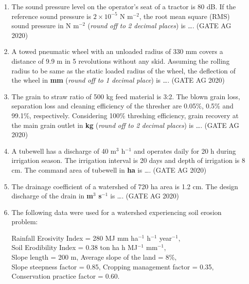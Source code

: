 \documentclass[journal]{IEEEtran}
\begin{document}
\begin{enumerate}
\medskip

\item 
The sound pressure level on the operator's seat of a tractor is 80 dB. If the reference sound pressure is $2 \times 10^{-5}$ N m$^{-2}$, the root mean square (RMS) sound pressure in N m$^{-2}$ (\textit{round off to 2 decimal places}) is \dots.
\hfill(GATE AG 2020)\\

\medskip

\item 
A towed pneumatic wheel with an unloaded radius of 330 mm covers a distance of 9.9 m in 5 revolutions without any skid. Assuming the rolling radius to be same as the static loaded radius of the wheel, the deflection of the wheel in \textbf{mm} (\textit{round off to 1 decimal place}) is \dots.
\hfill(GATE AG 2020)\\

\medskip

\item 
The grain to straw ratio of 500 kg feed material is 3:2. The blown grain loss, separation loss and cleaning efficiency of the thresher are 0.05\%, 0.5\% and 99.1\%, respectively. Considering 100\% threshing efficiency, grain recovery at the main grain outlet in \textbf{kg} (\textit{round off to 2 decimal places}) is \dots.
\hfill(GATE AG 2020)\\

\medskip

\item 
A tubewell has a discharge of 40 m$^3$ h$^{-1}$ and operates daily for 20 h during irrigation season. The irrigation interval is 20 days and depth of irrigation is 8 cm. The command area of tubewell in \textbf{ha} is \dots.
\hfill(GATE AG 2020)\\

\medskip

\item 
The drainage coefficient of a watershed of 720 ha area is 1.2 cm. The design discharge of the drain in \textbf{m$^3$ s$^{-1}$} is \dots.
\hfill(GATE AG 2020)\\

\medskip

\item 
The following data were used for a watershed experiencing soil erosion problem:

Rainfall Erosivity Index = 280 MJ mm ha$^{-1}$ h$^{-1}$ year$^{-1}$, \\
Soil Erodibility Index = 0.38 ton ha h MJ$^{-1}$ mm$^{-1}$, \\
Slope length = 200 m, Average slope of the land = 8\%, \\
Slope steepness factor = 0.85, Cropping management factor = 0.35, Conservation practice factor = 0.60.


\end{enumerate}
\end{document}
